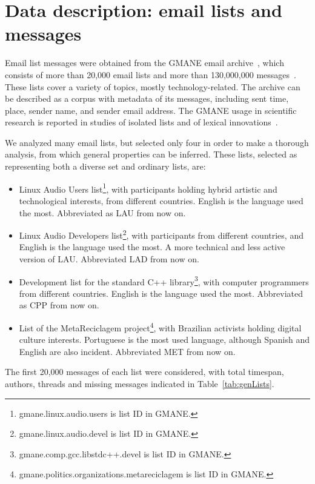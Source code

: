 \documentclass[%
 aip,
 jmp,%
 amsmath,amssymb,
 reprint,%
]{revtex4-1}
\begin{document}
\section{Data description: email lists and messages}\label{sec:data}

Email list messages were obtained from
the GMANE email archive~\cite{GMANE}, which consists of more than 20,000 email lists and more than 130,000,000 messages~\cite{GMANEwikipedia}. These lists cover a variety of topics, mostly technology-related. The archive can be described as a corpus with metadata of its messages, including sent time, place, sender name, and sender email address.
The GMANE usage in scientific research is reported in studies of isolated lists and of lexical innovations~\cite{GMANE2,bird}. 

We analyzed many email lists, but selected only four in order to make a thorough analysis, from which general properties can be inferred. These lists, selected as representing both a diverse set and ordinary lists, are:
\begin{itemize}
    \item Linux Audio Users list\footnote{gmane.linux.audio.users is list ID in GMANE.}, with participants holding hybrid artistic and technological interests, from different countries. English is the language used the most. Abbreviated as LAU from now on.
    \item Linux Audio Developers list\footnote{gmane.linux.audio.devel is list ID in GMANE.}, with participants from different countries, and English is the language used the most. A more technical and less active version of LAU. Abbreviated LAD from now on.
    \item Development list for the standard C++ library\footnote{gmane.comp.gcc.libstdc++.devel is list ID in GMANE.}, with computer programmers from different countries. English is the language used the most. Abbreviated as CPP from now on.
    \item List of the MetaReciclagem project\footnote{gmane.politics.organizations.metareciclagem is list ID in GMANE.}, with Brazilian activists holding digital culture interests. Portuguese is the most used language, although Spanish and English are also incident. Abbreviated MET from now on.
\end{itemize} 

 The first 20,000 messages of each list were considered, with total timespan, authors, threads and missing messages indicated in Table~\ref{tab:genLists}.
\end{document}
